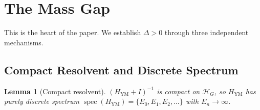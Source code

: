\documentclass[11pt,a4paper]{article}
\theoremstyle{plain}
\newtheorem{lemma}[theorem]{Lemma}
\theoremstyle{remark}
\newcommand{\HH}{\mathcal{H}}
\newcommand{\spec}{\operatorname{spec}}
\begin{document}
\section{The Mass Gap}
\label{sec:massgap}

This is the heart of the paper. We establish $\Delta > 0$ through
three independent mechanisms.

\subsection{Compact Resolvent and Discrete Spectrum}

\begin{lemma}[Compact resolvent]
\label{lem:compact}
$(H_{\mathrm{YM}} + I)^{-1}$ is compact on $\HH_G$, so $H_{\mathrm{YM}}$
has purely discrete spectrum $\spec(H_{\mathrm{YM}}) =
\{E_0, E_1, E_2, \ldots\}$ with $E_n \to \infty$.
\end{lemma}
\end{document}
